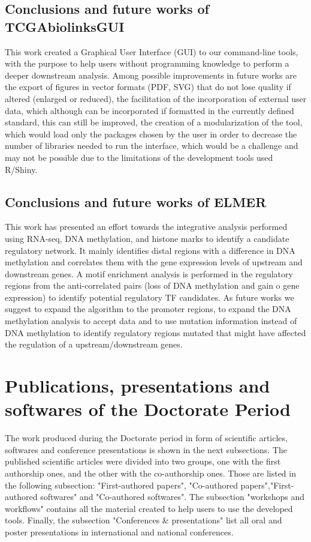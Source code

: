 \subsection{Conclusions and future works of TCGAbiolinksGUI}

This work created a Graphical User Interface (GUI) to our command-line tools,
with the purpose to help users without programming knowledge to perform a
deeper downstream analysis. Among possible improvements in future works are
the export of figures in vector formats (PDF, SVG) that do not lose quality
if altered (enlarged or reduced), the facilitation of the incorporation of external
user data, which although can be incorporated if formatted in the currently defined standard,
this can still be improved, the creation of a modularization of the tool,
which would load only the packages chosen by the user in order to decrease the
 number of libraries needed to run the interface, which
would be a challenge and may not be possible due to the limitations of the development tools used R/Shiny.

\subsection{Conclusions and future works of ELMER}

This work has presented an effort towards the integrative analysis performed
using RNA-seq, DNA methylation, and histone marks to identify a candidate regulatory network.
It mainly identifies distal regions with a difference in DNA methylation and correlates them
with the gene expression levels of upstream and downstream genes.
A motif enrichment analysis is performed in the regulatory regions from the anti-correlated
pairs (loss of DNA methylation and gain o gene expression) to identify potential
regulatory TF candidates. As future works we suggest to expand the algorithm to
the promoter regions, to expand the DNA methylation analysis to accept
 data
 and to use mutation information instead of DNA methylation
to identify regulatory regions mutated that might have affected the
regulation of a upstream/downstream genes.


\section{Publications, presentations and softwares of the Doctorate Period}

The work produced during the Doctorate period in form of scientific articles,
softwares and conference presentations is shown in the next subsections.
The published scientific articles were divided into two groups, one with the  first authorship ones, and the other with the co-authorship ones. Those are listed in the following subsection: "First-authored papers", "Co-authored papers","First-authored softwares" and "Co-authored softwares".
The subsection "workshops and workflows" contains all the material created to help users to use the developed tools. Finally, the subsection "Conferences \& presentations" list all oral and poster presentations in international and national conferences.

